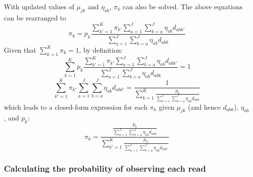 \documentclass{article}
\begin{document}
With updated values of $\mu_{jk}$ and $\eta_{ab}$, $\pi_k$ can also be solved.
The above equations can be rearranged to
\begin{equation}
    \pi_k = p_k \frac{\sum_{k'=1}^{K} \pi_{k'} \sum_{a=1}^{J} \sum_{b=a}^{J} \eta_{ab} d_{abk'}}{\sum_{a=1}^{J} \sum_{b=a}^{J} \eta_{ab} d_{abk}}
\end{equation}
Given that $\sum_{k=1}^{K} \pi_k = 1$, by definition:
\begin{equation}
    \sum_{k=1}^{K} p_k \frac{\sum_{k'=1}^{K} \pi_{k'} \sum_{a=1}^{J} \sum_{b=a}^{J} \eta_{ab} d_{abk'}}{\sum_{a=1}^{J} \sum_{b=a}^{J} \eta_{ab} d_{abk}} = 1
\end{equation}
\begin{equation}
    \sum_{k'=1}^{K} \pi_{k'} \sum_{a=1}^{J} \sum_{b=a}^{J} \eta_{ab} d_{abk'} = \frac{1}{\sum_{k=1}^{K} \frac{p_k}{\sum_{a=1}^{J} \sum_{b=a}^{J} \eta_{ab} d_{abk}}}
\end{equation}
which leads to a closed-form expression for each $\pi_k$ given $\mu_{jk}$ (and hence $d_{abk}$), $\eta_{ab}$, and $p_k$:
\begin{equation}
    \pi_k = \frac{\frac{p_k}{ \sum_{a=1}^{J} \sum_{b=a}^{J} \eta_{ab} d_{abk}}}{\sum_{k'=1}^{K} \frac{p_{k'}}{\sum_{a=1}^{J} \sum_{b=a}^{J} \eta_{ab} d_{abk'}}}
\end{equation}

\subsubsection{Calculating the probability of observing each read}
\label{calc-read-probability}
\end{document}
